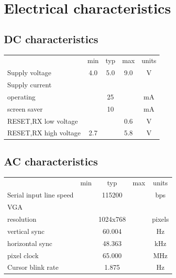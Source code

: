 \documentclass{article}
\newcommand{\heavyline}{\specialrule{1pt}{1pt}{1pt}}
\begin{document}
\newpage
\hypertarget{technical-specifications}{}
\hypertarget{technical-specifications}{%
\section{Electrical characteristics}\label{electrical-characteristics}}

\subsection{DC characteristics}
\vspace{10 pt}
{\renewcommand{\arraystretch}{1.2}%

\begin{tabularx}{\linewidth}{Xcccc}
\heavyline
& min & typ & max & units \\ \heavyline

Supply voltage & 4.0 & 5.0 & 9.0 & V \\ \hline

Supply current & & & & \\
\hspace{10pt} operating & & 25 & & mA \\
\hspace{10pt} screen saver & & 10 & & mA \\ \hline

RESET,RX low voltage & & & 0.6 & V \\ \hline
RESET,RX high voltage & 2.7 &   & 5.8 & V \\ \hline
\end{tabularx}}
\vspace{10 pt}

\subsection{AC characteristics}
\vspace{10 pt}

{\renewcommand{\arraystretch}{1.2}%
\begin{tabularx}{\linewidth}{Xcccc}
\heavyline
& min & typ & max & units \\ \heavyline

Serial input line speed & & 115200 & & bps \\ \hline

VGA & & & & \\
\hspace{10pt} resolution & & 1024x768 & & pixels \\
\hspace{10pt} vertical sync & & 60.004 & & Hz \\
\hspace{10pt} horizontal sync & & 48.363 & & kHz \\
\hspace{10pt} pixel clock & & 65.000 & & MHz \\ \hline

Cursor blink rate & & 1.875 & & Hz \\ \hline
\end{tabularx}}
\vspace{10 pt}
\end{document}
